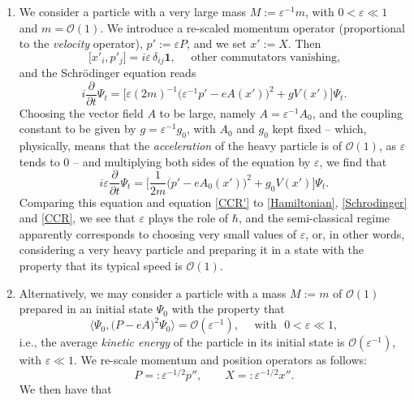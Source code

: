 \documentclass[12pt]{article}
\begin{document}
\begin{enumerate}
\item{We consider a particle with a very large mass $M:=\varepsilon^{-1}m$, with $0<\varepsilon \ll 1$ and 
$m= \mathcal{O}(1)$. We introduce a re-scaled momentum operator (proportional to the \textit{velocity} operator),
$p':= \varepsilon P$, and we set $x':=X$. Then
\begin{equation}\label{CCR'}
\big[x'_i, p'_j\big] = i \varepsilon\, \delta_{ij}\mathbf{1}, \quad \text{ other commutators vanishing,}
\end{equation}
and the Schr\"odinger equation reads
$$i\frac{\partial}{\partial t} \Psi_t = \Big[\varepsilon(2m)^{-1} \big(\varepsilon^{-1}p'- eA(x')\big)^{2}+ g V(x')\Big] \Psi_t.$$
Choosing the vector field $A$ to be large, namely $A= \varepsilon^{-1} A_0$, and the coupling constant to be given by 
$g= \varepsilon^{-1} g_0$, with $A_0$ and $g_0$ kept fixed -- which, physically, means that the \textit{acceleration} 
of the heavy particle is of $\mathcal{O}(1)$, as $\varepsilon$ tends to 0 -- and multiplying both sides of the 
equation by $\varepsilon$, we find that
$$i\varepsilon \frac{\partial}{\partial t}\Psi_t = \Big[\frac{1}{2m} \big(p'- eA_0(x')\big)^{2} + g_0 V(x')\Big] \Psi_t.$$
Comparing this equation and equation \eqref{CCR'} to \eqref{Hamiltonian}, \eqref{Schrodinger} and \eqref{CCR},
we see that $\varepsilon$ plays the role of $\hbar$, and the semi-classical regime apparently corresponds to choosing 
very small values of $\varepsilon$, or, in other words, considering a very heavy particle and preparing it in a state with the property that its typical speed is $\mathcal{O}(1)$.}
\item{Alternatively, we may consider a particle with a mass $M:=m$ of $\mathcal{O}(1)$ prepared in an initial 
state $\Psi_0$ with the property that 
\begin{equation}\label{high-speed}
\langle \Psi_0, \big(P-eA\big)^{2} \Psi_0 \rangle = \mathcal{O}(\varepsilon^{-1}),\quad \text{ with } \,\, 0< \varepsilon \ll 1,
\end{equation}
i.e., the average \textit{kinetic energy} of the particle in its initial state is $\mathcal{O}(\varepsilon^{-1})$, with 
$\varepsilon \ll 1$. We re-scale momentum and position operators as follows:
\begin{equation}\label{rescale}
P=: \varepsilon^{-1/2} p'', \qquad X=:\varepsilon^{-1/2} x''.
\end{equation}
We then have that
\begin{equation}\label{CCR''}

\end{equation}}
\end{enumerate}
\end{document}
